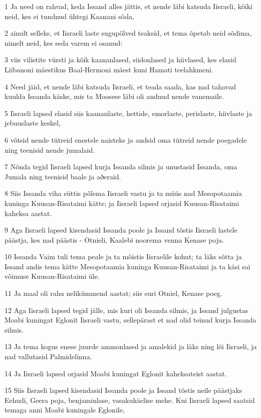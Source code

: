 \par 1 Ja need on rahvad, keda Issand alles jättis, et nende läbi katsuda Iisraeli, kõiki neid, kes ei tundnud ühtegi Kaanani sõda,
\par 2 ainult selleks, et Iisraeli laste sugupõlved teaksid, et tema õpetab neid sõdima, nimelt neid, kes seda varem ei osanud:
\par 3 viis vilistite vürsti ja kõik kaananlased, siidonlased ja hiivlased, kes elasid Liibanoni mäestikus Baal-Hermoni mäest kuni Hamati teelahkmeni.
\par 4 Need jäid, et nende läbi katsuda Iisraeli, et teada saada, kas nad tahavad kuulda Issanda käske, mis ta Moosese läbi oli andnud nende vanemaile.
\par 5 Iisraeli lapsed elasid siis kaananlaste, hettide, emorlaste, perislaste, hiivlaste ja jebuuslaste keskel,
\par 6 võtsid nende tütreid enestele naisteks ja andsid oma tütreid nende poegadele ning teenisid nende jumalaid.
\par 7 Nõnda tegid Iisraeli lapsed kurja Issanda silmis ja unustasid Issanda, oma Jumala ning teenisid baale ja aðeraid.
\par 8 Siis Issanda viha süttis põlema Iisraeli vastu ja ta müüs nad Mesopotaamia kuninga Kuusan-Risataimi kätte; ja Iisraeli lapsed orjasid Kuusan-Risataimi kaheksa aastat.
\par 9 Aga Iisraeli lapsed kisendasid Issanda poole ja Issand tõstis Iisraeli lastele päästja, kes nad päästis - Otnieli, Kaalebi noorema venna Kenase poja.
\par 10 Issanda Vaim tuli tema peale ja ta mõistis Iisraelile kohut; ta läks sõtta ja Issand andis tema kätte Mesopotaamia kuninga Kuusan-Risataimi ja ta käsi sai võimuse Kuusan-Risataimi üle.
\par 11 Ja maal oli rahu nelikümmend aastat; siis suri Otniel, Kenase poeg.
\par 12 Aga Iisraeli lapsed tegid jälle, mis kuri oli Issanda silmis, ja Issand julgustas Moabi kuningat Eglonit Iisraeli vastu, sellepärast et nad olid teinud kurja Issanda silmis.
\par 13 Ja tema kogus enese juurde ammonlased ja amalekid ja läks ning lõi Iisraeli, ja nad vallutasid Palmidelinna.
\par 14 Ja Iisraeli lapsed orjasid Moabi kuningat Eglonit kaheksateist aastat.
\par 15 Siis Iisraeli lapsed kisendasid Issanda poole ja Issand tõstis neile päästjaks Eehudi, Geera poja, benjaminlase, vasakukäelise mehe. Kui Iisraeli lapsed saatsid temaga anni Moabi kuningale Eglonile,
